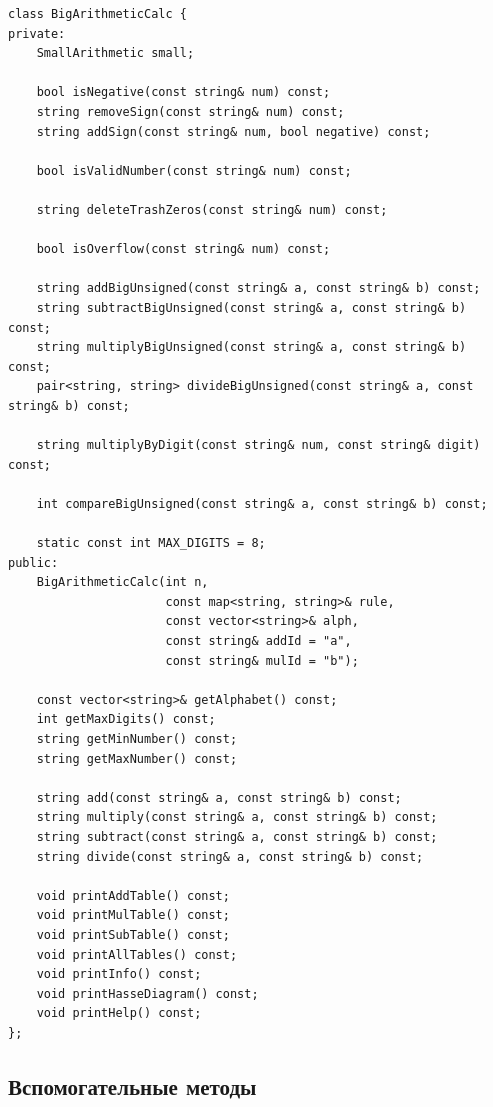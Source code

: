 \begin{lstlisting}[style=cstyle, caption={Интерфейс класса BigArithmeticCalc}]
class BigArithmeticCalc {
private:
    SmallArithmetic small;

    bool isNegative(const string& num) const;
    string removeSign(const string& num) const;
    string addSign(const string& num, bool negative) const;
    
    bool isValidNumber(const string& num) const;
    
    string deleteTrashZeros(const string& num) const;
    
    bool isOverflow(const string& num) const;

    string addBigUnsigned(const string& a, const string& b) const;
    string subtractBigUnsigned(const string& a, const string& b) const;
    string multiplyBigUnsigned(const string& a, const string& b) const;
    pair<string, string> divideBigUnsigned(const string& a, const string& b) const;
    
    string multiplyByDigit(const string& num, const string& digit) const;
    
    int compareBigUnsigned(const string& a, const string& b) const;

   	static const int MAX_DIGITS = 8;
public:
    BigArithmeticCalc(int n, 
                      const map<string, string>& rule, 
                      const vector<string>& alph,
                      const string& addId = "a",
                      const string& mulId = "b");
    
    const vector<string>& getAlphabet() const;
    int getMaxDigits() const;
    string getMinNumber() const;
    string getMaxNumber() const;
    
    string add(const string& a, const string& b) const;
    string multiply(const string& a, const string& b) const;
    string subtract(const string& a, const string& b) const;
    string divide(const string& a, const string& b) const; 
    
    void printAddTable() const;
    void printMulTable() const;
    void printSubTable() const;
    void printAllTables() const;
    void printInfo() const;
    void printHasseDiagram() const;
    void printHelp() const;
};
\end{lstlisting}

\subsection*{Вспомогательные методы}

